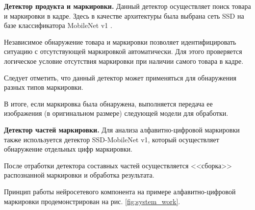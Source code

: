 \textbf{Детектор продукта и маркировки.} Данный детектор осуществляет поиск товара и маркировки в кадре. Здесь в качестве архитектуры была выбрана сеть SSD \cite{liu} на базе классификатора MobileNet v1 \cite{howard}.

Независимое обнаружение товара и маркировки позволяет идентифицировать ситуацию с отсутствующей маркировкой автоматически. Для этого проверяется логическое условие отсутствия маркировки при наличии самого товара в кадре.

Следует отметить, что данный детектор может применяться для обнаружения разных типов маркировки.

В итоге, если маркировка была обнаружена, выполняется передача ее изображения (в оригинальном размере) следующей модели для обработки.


\textbf{Детектор частей маркировки.} Для анализа алфавитно-цифровой маркировки также используется детектор SSD-MobileNet v1, который осуществляет обнаружение отдельных цифр маркировки.

После отработки детектора составных частей осуществляется <<сборка>> распознанной маркировки и обработка результата.

Принцип работы нейросетевого компонента на примере алфавитно-цифровой маркировки продемонстрирован на рис. \ref{fig:system_work}.

